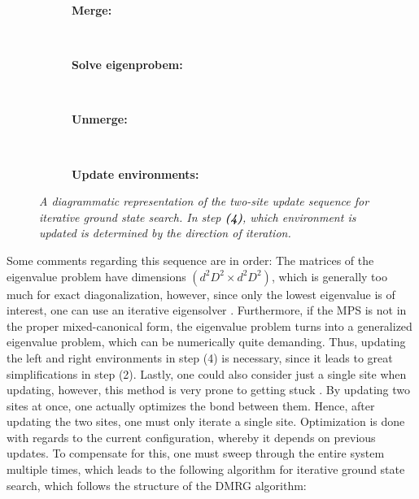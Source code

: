 \renewcommand{\thesubfigure}{\arabic{subfigure}}
\begin{figure}[h!]
	\centering
	\begin{subfigure}{\textwidth}
		\centering
		\caption{\textbf{Merge:}}
		
	\end{subfigure}\\[.8cm]
	
	\begin{subfigure}{\textwidth}
		\centering
		\caption{\textbf{Solve eigenprobem:}}
		
	\end{subfigure}\\[.8cm]

	\begin{subfigure}{\textwidth}
		\centering
		\caption{\textbf{Unmerge:}}
		
	\end{subfigure}\\[.8cm]

	\begin{subfigure}{\textwidth}
		\centering
		\caption{\textbf{Update environments:}}
		
	\end{subfigure}
	
	
	\caption{\textit{A diagrammatic representation of the two-site update sequence for iterative ground state search. In step \textbf{(4)}, which environment is updated is determined by the direction of iteration.}}
	\label{fig:twoSiteUpdate}
\end{figure}

Some comments regarding this sequence are in order: The matrices of the eigenvalue problem have dimensions $( d^2 D^2 \times d^2 D^2)$, which is generally too much for exact diagonalization, however, since only the lowest eigenvalue is of interest, one can use an iterative eigensolver \cite{Lanczos}. Furthermore, if the MPS is not in the proper mixed-canonical form, the eigenvalue problem turns into a generalized eigenvalue problem, which can be numerically quite demanding. Thus, updating the left and right environments in step (4) is necessary, since it leads to great simplifications in step (2). Lastly, one could also consider just a single site when updating, however, this method is very prone to getting stuck \cite{WhiteSingleSite}. By updating two sites at once, one actually optimizes the bond between them. Hence, after updating the two sites, one must only iterate a single site. Optimization is done with regards to the current configuration, whereby it depends on previous updates. To compensate for this, one must sweep through the entire system multiple times, which leads to the following algorithm for iterative ground state search, which follows the structure of the DMRG algorithm:

